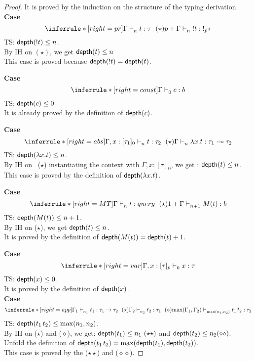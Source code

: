 \documentclass{article}
\begin{document}
\begin{proof}
 It is proved by the induction on the structure of the typing derivation.\\
 \noindent \textbf{Case} 
 \[
 \inferrule*[right = pr]
   {\Gamma \jtype{n}{}{t}{\tau} ~(\star) } 
   {p + \Gamma \jtype{n}{}{!t}{!_p \tau}  }
 \]
 TS: $\mathsf{depth}(!t) \leq n $.\\
 By IH on $(\star)$, we get $\mathsf{depth}(t) \leq n $ \\
 This case is proved because $\mathsf{depth}(!t)= \mathsf{depth}(t)$.
 
 \noindent \textbf{Case} 
 \[
  \inferrule*[right = const]
   {\empty}
   {\Gamma \jtype{0}{}{c}{b}  }
 \]
 TS: $\mathsf{depth}(c) \leq 0$ \\
 It is already proved by the definition of $\mathsf{depth}(c)$.
 
  \noindent \textbf{Case} 
  \[
   \inferrule*[right = abs]
   {\Gamma, x: [\tau_1]_{0} \jtype{n}{}{t}{\tau_2} ~(\star)}
   { \Gamma \jtype{n}{}{\abs{x}{t}}{\tau_1 \multimap \tau_2}  }
  \]
  TS: $\mathsf{depth}(\mathrel { \lambda {x} . {t} }) \leq n $. \\
  By IH on ~($\star$) instantiating the context with $\Gamma, x: [\tau]_0 $, we get : $\mathsf{depth}(t) \leq n $. \\
    This case is proved by the definition of $\mathsf{depth}(\mathrel { \lambda {x} . {t} })$.
  
   \noindent \textbf{Case} 
  \[
   \inferrule*[ right = MT ]
   {\Gamma \jtype{n}{}{t}{query} ~ (\star) }
   {1 + \Gamma \jtype{n+1}{}{M(t)}{b}  }
  \]
   TS: $\mathsf{depth}( M(t) ) \leq n+1 $. \\
   By IH on ($\star$), we get $\mathsf{depth}(t) \leq n $. \\
   It is proved by the definition of $\mathsf{depth}(M(t)) = \mathsf{depth}(t) + 1 $.
   
   \noindent \textbf{Case} 
   \[
    \inferrule*[ right = var]
   {\empty}
   {\Gamma, x:[\tau]_p \jtype{0}{}{x}{\tau}  } 
   \]
   TS: $\mathsf{depth}(x) \leq 0$. \\
   It is proved by the definition of $\mathsf{depth}(x)$. \\
   
    \noindent \textbf{Case} 
    \[
     \inferrule*[ right = app ]
   {\Gamma_1 \jtype{n_1}{}{t_1}{\tau_1 \rightarrow \tau_2} ~ (\star) \\ \Gamma_2 \jtype{n_2}{}{t_2}{\tau_1}~(\diamond)}
   { \max(\Gamma_1,\Gamma_2) \jtype{\max(n_1,n_2)}{}{\app{t_1}{t_2}}{\tau_2}  }
    \]
    TS: $\mathsf{depth}(\mathrel{ {t_1} \, {t_2} }) \leq \max(n_1,n_2) $. \\
    By IH on ($\star$) and ($\diamond$), we get: $\depth(t_1) \leq n_1~(\star\star) $ and $\mathsf{depth}(t_2) \leq n_2 (\diamond\diamond)$. \\
    Unfold the definition of $\mathsf{depth}(\mathrel{ {t_1} \, {t_2} }) = \max(\mathsf{depth}(t_1), \mathsf{depth}(t_2))$.\\
    This case is proved by the ($\star\star$) and ($\diamond\diamond$).
    

\end{proof}
\end{document}
